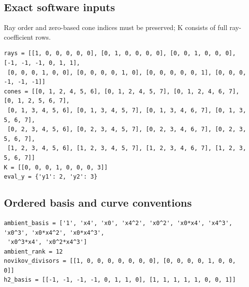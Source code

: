 \documentclass[10pt,a4paper]{article}
\begin{document}
\subsection*{Exact software inputs}
Ray order and zero-based cone indices must be preserved; K consists of full ray-coefficient rows.
\begin{lstlisting}
rays = [[1, 0, 0, 0, 0, 0], [0, 1, 0, 0, 0, 0], [0, 0, 1, 0, 0, 0], [-1, -1, -1, 0, 1, 1],
 [0, 0, 0, 1, 0, 0], [0, 0, 0, 0, 1, 0], [0, 0, 0, 0, 0, 1], [0, 0, 0, -1, -1, -1]]
cones = [[0, 1, 2, 4, 5, 6], [0, 1, 2, 4, 5, 7], [0, 1, 2, 4, 6, 7], [0, 1, 2, 5, 6, 7],
 [0, 1, 3, 4, 5, 6], [0, 1, 3, 4, 5, 7], [0, 1, 3, 4, 6, 7], [0, 1, 3, 5, 6, 7],
 [0, 2, 3, 4, 5, 6], [0, 2, 3, 4, 5, 7], [0, 2, 3, 4, 6, 7], [0, 2, 3, 5, 6, 7],
 [1, 2, 3, 4, 5, 6], [1, 2, 3, 4, 5, 7], [1, 2, 3, 4, 6, 7], [1, 2, 3, 5, 6, 7]]
K = [[0, 0, 0, 1, 0, 0, 0, 3]]
eval_y = {'y1': 2, 'y2': 3}
\end{lstlisting}
\subsection*{Ordered basis and curve conventions}
\begin{lstlisting}
ambient_basis = ['1', 'x4', 'x0', 'x4^2', 'x0^2', 'x0*x4', 'x4^3', 'x0^3', 'x0*x4^2', 'x0*x4^3',
 'x0^3*x4', 'x0^2*x4^3']
ambient_rank = 12
novikov_divisors = [[1, 0, 0, 0, 0, 0, 0, 0], [0, 0, 0, 0, 1, 0, 0, 0]]
h2_basis = [[-1, -1, -1, -1, 0, 1, 1, 0], [1, 1, 1, 1, 1, 0, 0, 1]]
\end{lstlisting}
\end{document}
